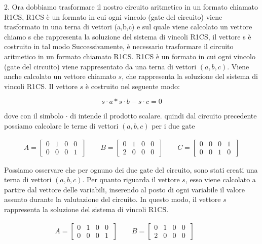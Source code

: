 2. Ora dobbiamo trasformare il nostro circuito aritmetico in un formato chiamato R1CS, R1CS è un formato in cui ogni
vincolo (gate del circuito) viene trasformato in una terna di vettori (a,b,c) e sul quale viene calcolato un vettore
chiamo s che rappresenta la soluzione del sistema di vincoli R1CS, il vettore s è costruito in tal modo Successivamente,
è necessario trasformare il circuito aritmetico in un formato chiamato R1CS. R1CS è un formato in cui ogni vincolo (gate
del circuito) viene rappresentato da una terna di vettori $(a,b,c)$. Viene anche calcolato un vettore chiamato $s$, che
rappresenta la soluzione del sistema di vincoli R1CS. Il vettore $s$ è costruito nel seguente modo:
    
$$
s \cdot a * s \cdot  b - s \cdot  c = 0
$$
    
dove con il simbolo $\cdot$  di intende il prodotto scalare. quindi dal circuito precedente possiamo calcolare le
terne di vettori $(a,b,c)$ per i due gate

\begin{gather*}
    A =
    \begin{bmatrix}
    0 & 1 & 0 & 0 \\
    0 & 0 & 0 & 1 \
    \end{bmatrix}
    \qquad
    B =
    \begin{bmatrix}
    0 & 1 & 0 & 0 \\
    2 & 0 & 0 & 0 \
    \end{bmatrix}
    \qquad
    C =
    \begin{bmatrix}
    0 & 0 & 0 & 1 \\
    0 & 0 & 1 & 0 \
    \end{bmatrix}
\end{gather*}
    
Possiamo osservare che per ognuno dei due gate del circuito, sono stati creati una terna di vettori $(a,b,c)$. Per
quanto riguarda il vettore $s$, esso viene calcolato a partire dal vettore delle variabili, inserendo al posto di
ogni variabile il valore assunto durante la valutazione del circuito. In questo modo, il vettore $s$ rappresenta la
soluzione del sistema di vincoli R1CS.

\begin{gather*}
    A =
    \begin{bmatrix}
    0 & 1 & 0 & 0 \\
    0 & 0 & 0 & 1 \
    \end{bmatrix}
    \qquad
    B =
    \begin{bmatrix}
    0 & 1 & 0 & 0 \\
    2 & 0 & 0 & 0 \
    \end{bmatrix}
    \qquad
\end{gather*}

